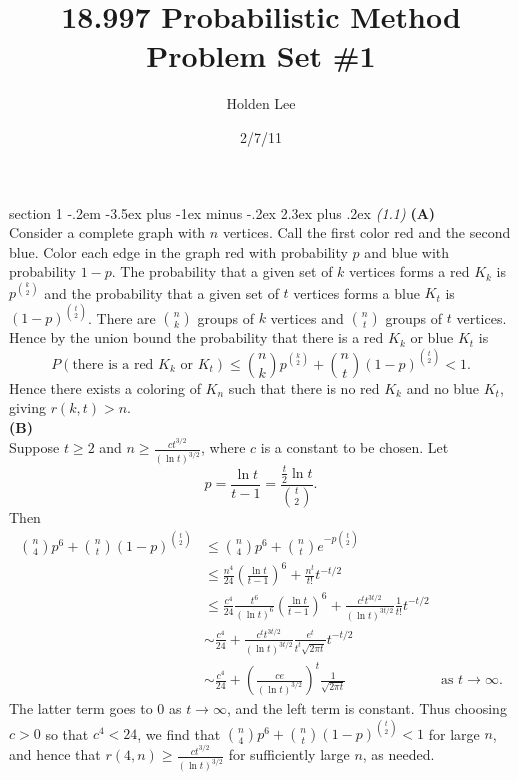 \documentclass[12pt]{article}
\makeatletter
\theoremstyle{norm}
\newcommand{\rc}[1]{\frac{1}{#1}}
\newcommand{\pa}[1]{\left( {#1} \right)}
\newcommand{\subprob}[1]{\noindent\textbf{#1}\\}
\newcommand{\pf}[2]{\pa{\frac{#1}{#2}}}
\newenvironment{problem}{\@startsection
       {section}
       {1}
       {-.2em}
       {-3.5ex plus -1ex minus -.2ex}
       {2.3ex plus .2ex}
       {\pagebreak[3]%
       \large\bf\noindent{Problem }
       }
       }
       {%
       }
\makeatother
\begin{document}
\title{18.997 Probabilistic Method Problem Set \#1}%
\author{Holden Lee}
\date{2/7/11}%
\maketitle
\thispagestyle{empty}

\begin{problem}{\it(1.1)}
\subprob{(A)}
Consider a complete graph with $n$ vertices. Call the first color red and the second blue. Color each edge in the graph red with probability $p$ and blue with probability $1-p$. The probability that a given set of $k$ vertices forms a red $K_k$ is $p^{\binom k2}$ and the probability that a given set of $t$ vertices forms a blue $K_t$ is $(1-p)^{\binom t2}$. There are $\binom nk$ groups of $k$ vertices and $\binom nt$ groups of $t$ vertices. Hence by the union bound the probability that there is a red $K_k$ or blue $K_t$ is
\[
P(\text{there is a red }K_k\text{ or }K_t)\leq \binom nk p^{\binom k2}+\binom nt(1-p)^{\binom t2}<1.
\]
Hence there exists a coloring of $K_n$ such that there is no red $K_k$ and no blue $K_t$, giving $r(k,t)>n$.\\

\subprob{(B)}
Suppose $t\geq 2$ and $n\geq \frac{ct^{3/2}}{(\ln t)^{3/2}}$, where $c$ is a constant to be chosen. Let
\[
p=\frac{\ln t}{t-1}=\frac{\frac t2\ln t}{\binom t2}.
\]
Then
\begin{align*}
\binom n4 p^{6}+\binom nt (1-p)^{\binom t2}
&\leq \binom n4 p^6 +\binom nt e^{-p\binom t2}\\
&\leq \frac{n^4}{24} \pf{\ln t}{t-1}^6+\frac{n^t}{t!}t^{-t/2}\\
&\leq \frac{c^4}{24}\frac{t^6}{(\ln t)^6} \pf{\ln t}{t-1}^6 + \frac{c^{t}t^{3t/2}}{(\ln t)^{3t/2}}\rc{t!}t^{-t/2}\\
&\sim \frac{c^4}{24}+\frac{c^{t}t^{3t/2}}{(\ln t)^{3t/2}} \frac{e^t}{t^t\sqrt{2\pi t}} t^{-t/2}\\
&\sim \frac{c^4}{24}+\pf{ce}{(\ln t)^{3/2}}^t\rc{\sqrt{2\pi t}}&\text{as }t\to \infty.
\end{align*}
The latter term goes to 0 as $t\to \infty$, and the left term is constant. Thus choosing $c>0$ so that $c^4<24$, we find that $\binom n4 p^{6}+\binom nt (1-p)^{\binom t2}<1$ for large $n$, and hence that $r(4,n)\geq \frac{ct^{3/2}}{(\ln t)^{3/2}}$ for sufficiently large $n$, as needed. %

\end{problem}
\end{document}
